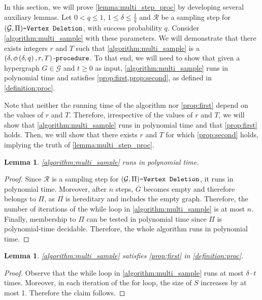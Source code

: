 \documentclass[letterpaper,11pt]{article}
\newcommand{\1}[1]{\mathds{1}\left[#1\right]}
\newcommand{\procext}[4]{\left( #1, #2, #3, #4 \right)\textnormal{-\texttt{procedure}}}
\newtheorem{lemma}[theorem]{Lemma}
\newcommand{\gpivd}[1][\mathcal{G},\Pi]{(#1)\textnormal{\texttt{-Vertex Deletion}}}
\begin{document}
In this section, we will prove \cref{lemma:multi_step_proc} by developing
several auxiliary lemmas. Let $0 < q \leq 1$, $1 \leq \delta \leq \frac{1}{q}$ and $\mathcal{R}$
be a sampling step  for $\gpivd$, with success probability $q$.
Consider \cref{algorithm:multi_sample} with these parameters.
We will demonstrate that there exists integers $r$ and $T$
such that \cref{algorithm:multi_sample} is a $\procext{\delta}{\phi\left( \delta, q \right) }{r}{T}$.
To that end, we will need to show that given a hypergraph $G \in
\mathcal{G}$ and $t \geq 0$ as input,
\cref{algorithm:multi_sample} runs in polynomial time and satisfies 
\cref{prop:first,prop:second}, as defined in \cref{definition:proc}.

Note that neither the running time of the algorithm nor \cref{prop:first}
depend on the values of $r$ and $T$. Therefore, irrespective of the values of $r$
and $T$, we will show that \cref{algorithm:multi_sample} runs in
polynomial time and that \cref{prop:first} holds.
Then, we will show that there exists $r$ and $T$ for which \cref{prop:second} holds,
implying the truth of  \cref{lemma:multi_step_proc}.

\begin{lemma}\label{lemma:multi_step_proc_rt}
	\cref{algorithm:multi_sample} runs in polynomial time.
\end{lemma}

\begin{proof}
	Since $\mathcal{R}$ is a sampling step for $\gpivd$, it runs in polynomial time.
	Moreover, after $n$ steps, $\overline{G}$ becomes empty and therefore belongs
	to $\Pi$, as $\Pi$ is hereditary and includes the empty graph.
	Therefore, the number of iterations of the while loop in \cref{algorithm:multi_sample} is at
	most $n$.
	Finally, membership to $\Pi$ can be tested in polynomial time since $\Pi$
	is polynomial-time decidable.
	Therefore, the whole algorithm runs in polynomial time.	
\end{proof}

\begin{lemma}\label{lemma:multi_step_proc_prop_1}
	\cref{algorithm:multi_sample} satisfies \cref{prop:first} in \cref{definition:proc}.
\end{lemma}

\begin{proof}
	Observe that the while loop in \cref{algorithm:multi_sample} runs at most
	$\delta \cdot t$ times. Moreover, in each iteration of the for loop, the
	size of $S$ increases by at most 1. Therefore the claim follows.
\end{proof}
\end{document}
